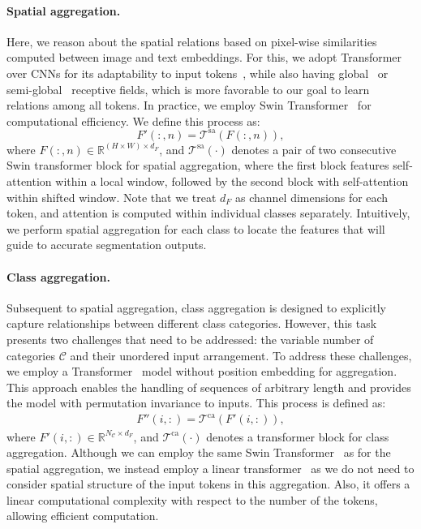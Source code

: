 \documentclass[10pt,twocolumn,letterpaper]{article}
\begin{document}
\paragraph{Spatial aggregation.} Here, we reason about the spatial relations based on pixel-wise similarities computed between image and text embeddings. 
For this, we adopt Transformer~\cite{vaswani2017attention,liu2021swin} over CNNs for its adaptability to input tokens~\cite{dai2021coatnet}, while also having global~\cite{vaswani2017attention} or semi-global~\cite{liu2021swin,hong2022cost} receptive fields, which is more favorable to our goal to learn relations among all tokens.  In practice, we employ Swin Transformer~\cite{liu2021swin} for computational efficiency. We define this process as:
\begin{equation}
    {F}'(:, n) = \mathcal{T}^\mathrm{sa}(F(:, n)), 
    \label{eq:spatial-aggregation}
\end{equation}
where $F(:,n)\in \mathbb{R}^{(H\times W)\times d_F}$, and $\mathcal{T}^\mathrm{sa}(\cdot)$ denotes a pair of two consecutive Swin transformer block for spatial aggregation, where the first block features self-attention within a local window, followed by the second block with self-attention within shifted window. Note that we treat $d_F$ as channel dimensions for each token, and attention is computed within individual classes separately. Intuitively, we perform spatial aggregation for each class to locate the features that will guide to accurate segmentation outputs. 

\vspace{-10pt}
\paragraph{Class aggregation.}
Subsequent to spatial aggregation, class aggregation is designed to explicitly capture relationships between different class categories. However, this task presents two challenges that need to be addressed: the variable number of categories $\mathcal{C}$ and their unordered input arrangement. To address these challenges, we employ a Transformer~\cite{vaswani2017attention} model without position embedding for aggregation.
This approach enables the handling of sequences of arbitrary length and provides the model with permutation invariance to inputs. This process is defined as: 
\begin{align}
    {F}''(i, :) = \mathcal{T}^\mathrm{ca}({F}'(i, :)),
    \label{eq:class-aggregation}
\end{align}
where $F'(i,:)\in \mathbb{R}^{N_{\mathcal{C}}\times d_F}$, and $\mathcal{T}^\mathrm{ca}(\cdot)$ denotes a transformer block for class aggregation. Although we can employ the same Swin Transformer~\cite{liu2021swin} as for the spatial aggregation, we instead employ a linear transformer~\cite{katharopoulos2020transformers} as we do not need to consider spatial structure of the input tokens in this aggregation. Also, it offers a linear computational complexity with respect to the number of the tokens, allowing efficient computation. 
\end{document}
